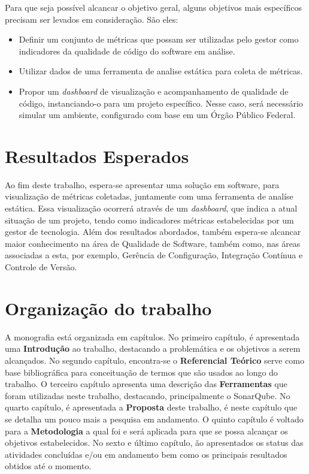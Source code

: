 	Para que seja possível alcancar o objetivo geral, alguns objetivos mais específicos precisam ser levados em consideração. São eles:
		 
	\begin{itemize}
		\item Definir um conjunto de métricas que possam ser utilizadas pelo gestor como indicadores da qualidade de código do software em análise.
		\item Utilizar dados de uma ferramenta de analise estática para coleta de métricas.  
		\item Propor um \textit{dashboard} de visualização e acompanhamento de qualidade de código, instanciando-o para um projeto específico. Nesse caso, será necessário simular um ambiente, configurado com base em um Órgão Público Federal.
		
	\end{itemize}
	
	
	\section{Resultados Esperados}

Ao fim deste trabalho, espera-se apresentar uma solução em software, para visualização de métricas coletadas,  juntamente com uma ferramenta de analíse estática. Essa visualização ocorrerá através de um \textit{dashboard}, que indica a atual situação de um projeto, tendo como indicadores métricas estabelecidas por um gestor de tecnologia. 
Além dos resultados abordados, também espera-se alcancar maior conhecimento na área de Qualidade de Software, também como, nas áreas associadas a esta, por exemplo, Gerência de Configuração, Integração Contínua e Controle de Versão.

	\section{Organização do trabalho} %
	\label{sec:organização_do_trabalho} 	
A monografia está organizada em capítulos. No primeiro capítulo, é apresentada uma \textbf{Introdução} ao trabalho, destacando a problemática e os objetivos a serem alcançados. No segundo capítulo, encontra-se o \textbf{Referencial Teórico} serve como base bibliográfica para conceituação de termos que são usados ao longo do trabalho. O terceiro capítulo apresenta uma descrição das \textbf{Ferramentas} que foram utilizadas neste trabalho, destacando, principalmente o SonarQube. No quarto capítulo, é apresentada a \textbf{Proposta} deste trabalho, é neste capítulo que se detalha um pouco mais a pesquisa em andamento. O quinto capítulo é voltado para a \textbf{Metodologia} a qual foi e será aplicada para que se possa alcançar os objetivos estabelecidos. No sexto e último capítulo, ão apresentados os status das atividades concluídas e/ou em andamento bem como os principais resultados obtidos até o momento.
